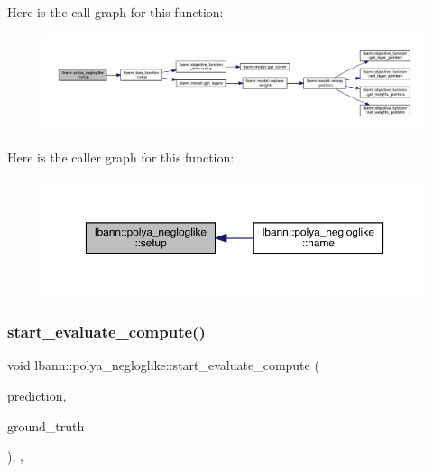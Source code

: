 Here is the call graph for this function\+:\nopagebreak
\begin{figure}[H]
\begin{center}
\leavevmode
\includegraphics[width=350pt]{classlbann_1_1polya__negloglike_a4a7ae8eef1ef216f60b158acb1853355_cgraph}
\end{center}
\end{figure}
Here is the caller graph for this function\+:\nopagebreak
\begin{figure}[H]
\begin{center}
\leavevmode
\includegraphics[width=350pt]{classlbann_1_1polya__negloglike_a4a7ae8eef1ef216f60b158acb1853355_icgraph}
\end{center}
\end{figure}
\mbox{\label{classlbann_1_1polya__negloglike_aea7e92b3d290f3d11b6f8c93f9f9d3e6}} 
\subsubsection{\texorpdfstring{start\+\_\+evaluate\+\_\+compute()}{start\_evaluate\_compute()}}
{\footnotesize\ttfamily void lbann\+::polya\+\_\+negloglike\+::start\+\_\+evaluate\+\_\+compute (\begin{DoxyParamCaption}\item[{const \hyperlink{base_8hpp_a9a697a504ae84010e7439ffec862b470}{Abs\+Dist\+Mat} \&}]{prediction,  }\item[{const \hyperlink{base_8hpp_a9a697a504ae84010e7439ffec862b470}{Abs\+Dist\+Mat} \&}]{ground\+\_\+truth }\end{DoxyParamCaption})\hspace{0.3cm}{\ttfamily [inline]}, {\ttfamily [override]}, {\ttfamily [virtual]}}

